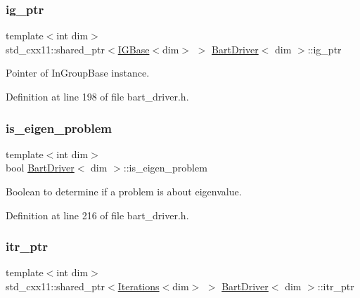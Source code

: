 \subsubsection{\texorpdfstring{ig\+\_\+ptr}{ig\_ptr}}
{\footnotesize\ttfamily template$<$int dim$>$ \\
std\+\_\+cxx11\+::shared\+\_\+ptr$<$\hyperlink{class_i_g_base}{I\+G\+Base}$<$dim$>$ $>$ \hyperlink{class_bart_driver}{Bart\+Driver}$<$ dim $>$\+::ig\+\_\+ptr\hspace{0.3cm}{\ttfamily [private]}}



Pointer of In\+Group\+Base instance. 



Definition at line 198 of file bart\+\_\+driver.\+h.

\mbox{\label{class_bart_driver_a6ee26434a788284182df94da5d71ca12}} 
\subsubsection{\texorpdfstring{is\+\_\+eigen\+\_\+problem}{is\_eigen\_problem}}
{\footnotesize\ttfamily template$<$int dim$>$ \\
bool \hyperlink{class_bart_driver}{Bart\+Driver}$<$ dim $>$\+::is\+\_\+eigen\+\_\+problem\hspace{0.3cm}{\ttfamily [private]}}



Boolean to determine if a problem is about eigenvalue. 



Definition at line 216 of file bart\+\_\+driver.\+h.

\mbox{\label{class_bart_driver_ae07e7a592dd255d69685f17d98a2ecc6}} 
\subsubsection{\texorpdfstring{itr\+\_\+ptr}{itr\_ptr}}
{\footnotesize\ttfamily template$<$int dim$>$ \\
std\+\_\+cxx11\+::shared\+\_\+ptr$<$\hyperlink{class_iterations}{Iterations}$<$dim$>$ $>$ \hyperlink{class_bart_driver}{Bart\+Driver}$<$ dim $>$\+::itr\+\_\+ptr\hspace{0.3cm}{\ttfamily [private]}}



